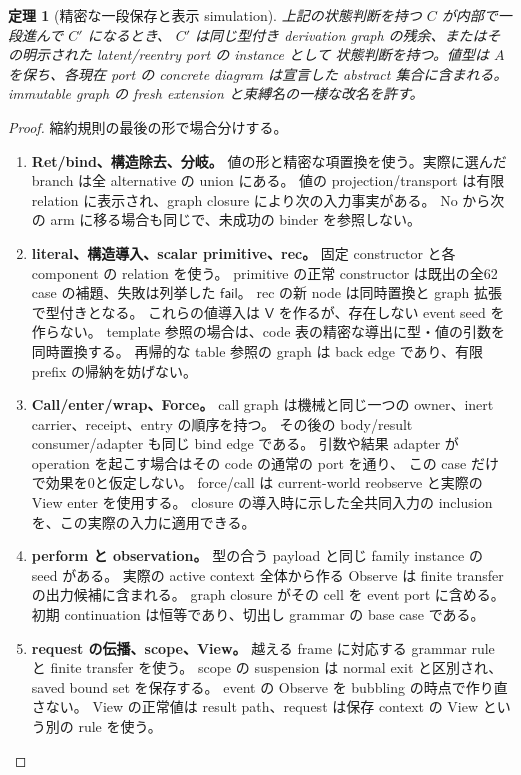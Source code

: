 \documentclass[11pt,a4paper]{article}
\newtheorem{theorem}[definition]{定理}
\newcommand{\Fail}{\mathsf{fail}}
\begin{document}
\begin{theorem}[精密な一段保存と表示 simulation]
上記の状態判断を持つ \(C\) が内部で一段進んで \(C'\) になるとき、
\(C'\) は同じ型付き derivation graph の残余、またはその明示された latent/reentry port の instance として
状態判断を持つ。値型は \(A\) を保ち、各現在 port の concrete diagram は宣言した abstract 集合に含まれる。
immutable graph の fresh extension と束縛名の一様な改名を許す。
\end{theorem}
\begin{proof}
縮約規則の最後の形で場合分けする。
\begin{enumerate}
\item \textbf{Ret/bind、構造除去、分岐。}
値の形と精密な項置換を使う。実際に選んだ branch は全 alternative の union にある。
値の projection/transport は有限 relation に表示され、graph closure により次の入力事実がある。
No から次の arm に移る場合も同じで、未成功の binder を参照しない。
\item \textbf{literal、構造導入、scalar primitive、rec。}
固定 constructor と各 component の relation を使う。
primitive の正常 constructor は既出の全62 case の補題、失敗は列挙した \(\Fail\)。
rec の新 node は同時置換と graph 拡張で型付きとなる。
これらの値導入は \(\mathsf V\) を作るが、存在しない event seed を作らない。
template 参照の場合は、code 表の精密な導出に型・値の引数を同時置換する。
再帰的な table 参照の graph は back edge であり、有限 prefix の帰納を妨げない。
\item \textbf{Call/enter/wrap、Force。}
call graph は機械と同じ一つの owner、inert carrier、receipt、entry の順序を持つ。
その後の body/result consumer/adapter も同じ bind edge である。
引数や結果 adapter が operation を起こす場合はその code の通常の port を通り、
この case だけで効果を0と仮定しない。
force/call は current-world reobserve と実際の View enter を使用する。
closure の導入時に示した全共同入力の inclusion を、この実際の入力に適用できる。
\item \textbf{perform と observation。}
型の合う payload と同じ family instance の seed がある。
実際の active context 全体から作る Observe は finite transfer の出力候補に含まれる。
graph closure がその cell を event port に含める。
初期 continuation は恒等であり、切出し grammar の base case である。
\item \textbf{request の伝播、scope、View。}
越える frame に対応する grammar rule と finite transfer を使う。
scope の suspension は normal exit と区別され、saved bound set を保存する。
event の Observe を bubbling の時点で作り直さない。
View の正常値は result path、request は保存 context の View という別の rule を使う。

\end{enumerate}
\end{proof}
\end{document}
